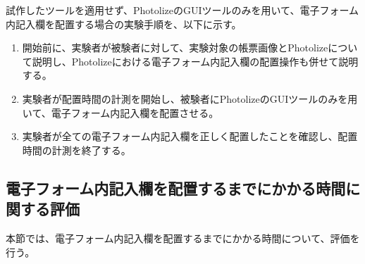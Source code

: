 試作したツールを適用せず、PhotolizeのGUIツールのみを用いて、電子フォーム内記入欄を配置する場合の実験手順を、以下に示す。

\begin{enumerate}
    \item 開始前に、実験者が被験者に対して、実験対象の帳票画像とPhotolizeについて説明し、Photolizeにおける電子フォーム内記入欄の配置操作も併せて説明する。
    \item 実験者が配置時間の計測を開始し、被験者にPhotolizeのGUIツールのみを用いて、電子フォーム内記入欄を配置させる。
    \item 実験者が全ての電子フォーム内記入欄を正しく配置したことを確認し、配置時間の計測を終了する。
\end{enumerate}

\subsection{電子フォーム内記入欄を配置するまでにかかる時間に関する評価}\label{subsec:evalue_required_time}
本節では、電子フォーム内記入欄を配置するまでにかかる時間について、評価を行う。

